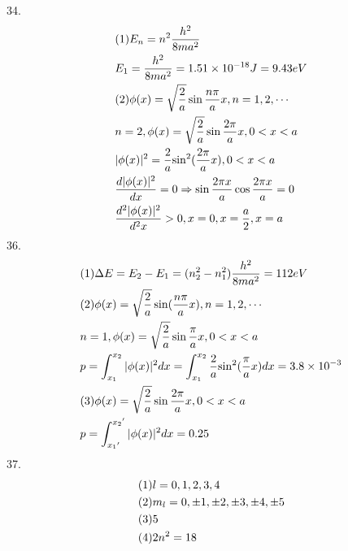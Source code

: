 \documentclass{article}
\begin{document}
34.\[\begin{gathered}
(1){E_n} = {n^2}\frac{{{h^2}}}{{8m{a^2}}} \hfill \\
{E_1} = \frac{{{h^2}}}{{8m{a^2}}} = 1.51 \times {10^{ - 18}}J = 9.43eV \hfill \\
(2)\phi (x) = \sqrt {\frac{2}{a}} \sin \frac{{n\pi }}{a}x,n = 1,2, \cdots  \hfill \\
n = 2,\phi (x) = \sqrt {\frac{2}{a}} \sin \frac{{2\pi }}{a}x,0 < x < a \hfill \\
|\phi (x){|^2} = \frac{2}{a}{\sin ^2}(\frac{{2\pi }}{a}x),0 < x < a \hfill \\
\frac{{d|\phi (x){|^2}}}{{dx}} = 0 \Rightarrow \sin \frac{{2\pi x}}{a}\cos \frac{{2\pi x}}{a} = 0 \hfill \\
\frac{{{d^2}|\phi (x){|^2}}}{{{d^2}x}} > 0,x = 0,x = \frac{a}{2},x = a \hfill \\ 
\end{gathered} \]
36.\[\begin{gathered}
(1)\Delta E = {E_2} - {E_1} = (n_2^2 - n_1^2)\frac{{{h^2}}}{{8m{a^2}}} = 112eV \hfill \\
(2)\phi (x) = \sqrt {\frac{2}{a}} \sin (\frac{{n\pi }}{a}x),n = 1,2, \cdots  \hfill \\
n = 1,\phi (x) = \sqrt {\frac{2}{a}} \sin \frac{\pi }{a}x,0 < x < a \hfill \\
p = \int_{{x_1}}^{{x_2}} {|\phi (x){|^2}dx = \int_{{x_1}}^{{x_2}} {\frac{2}{a}{{\sin }^2}(\frac{\pi }{a}x)dx} }  = 3.8 \times {10^{ - 3}} \hfill \\
(3)\phi (x) = \sqrt {\frac{2}{a}} \sin \frac{{2\pi }}{a}x,0 < x < a \hfill \\
p = \int_{{x_1}'}^{{x_2}'} {|\phi (x){|^2}dx}  = 0.25 \hfill \\ 
\end{gathered} \]
37.\[\begin{gathered}
(1)l = 0,1,2,3,4 \hfill \\
(2){m_l} = 0, \pm 1, \pm 2, \pm 3, \pm 4, \pm 5 \hfill \\
(3)5 \hfill \\
(4)2{n^2} = 18 \hfill \\ 
\end{gathered} \]
\end{document}
